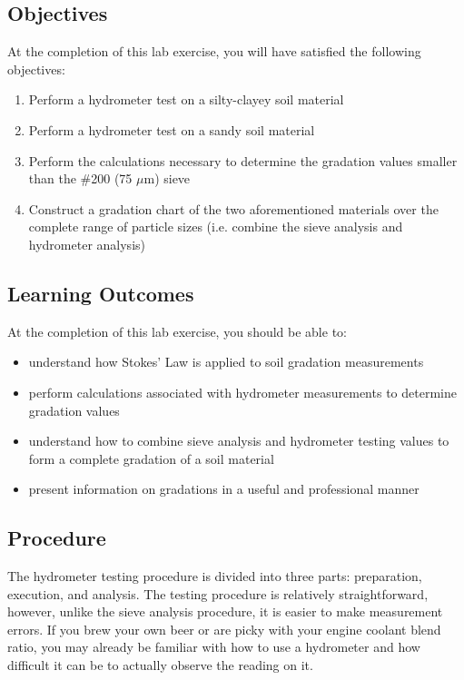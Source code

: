\documentclass[12pt]{article}
\begin{document}
\subsection{Objectives}
At the completion of this lab exercise, you will have satisfied the following objectives:
\begin{enumerate}
    \item Perform a hydrometer test on a silty-clayey soil material
    \item Perform a hydrometer test on a sandy soil material
    \item Perform the calculations necessary to determine the gradation values smaller than the \#200 (75 $\mu$m) sieve
    \item Construct a gradation chart of the two aforementioned materials over the complete range of particle sizes (i.e. combine the sieve analysis and hydrometer analysis)
\end{enumerate}

\subsection{Learning Outcomes}
At the completion of this lab exercise, you should be able to:
\begin{itemize}
    \item understand how Stokes' Law is applied to soil gradation measurements
    \item perform calculations associated with hydrometer measurements to determine gradation values
    \item understand how to combine sieve analysis and hydrometer testing values to form a complete gradation of a soil material
    \item present information on gradations in a useful and professional manner
\end{itemize}

\pagebreak
\subsection{Procedure}
The hydrometer testing procedure is divided into three parts: preparation, execution, and analysis. The testing procedure is relatively straightforward, however, unlike the sieve analysis procedure, it is easier to make measurement errors. If you brew your own beer or are picky with your engine coolant blend ratio, you may already be familiar with how to use a hydrometer and how difficult it can be to actually observe the reading on it.
\end{document}
